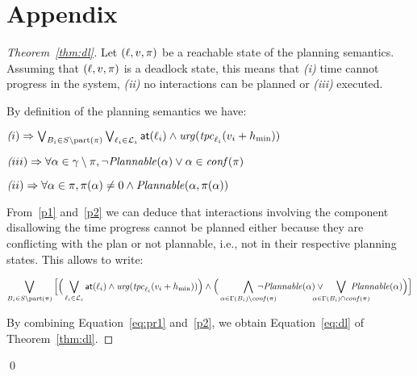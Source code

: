 \section{Appendix}
\begin{proof}[Theorem~\ref{thm:dl}]

Let $(\ell,v,\pi)$ be a reachable state of the planning semantics.
Assuming that $(\ell,v,\pi)$ is a deadlock state, this means that 
\emph{(i)} time cannot progress in the system, 
\emph{(ii)} no interactions can be planned or \emph{(iii)} executed.

By definition of the planning semantics we have:\\
\begin{description}[labelwidth=1.5cm]
  \setlength\itemsep{1em}
  \item[\namedlabel{p1}{R1}] $\emph(i)\Rightarrow
    \bigvee_{B_i\in S\setminus\mathrm{part}(\pi)}\bigvee_{\ell_i\in\mathcal{L}_i}\textnormal{\textsf{at}}(\ell_i)
    \wedge\textnormal{\textit{urg}}(\mathit{tpc}_{\ell_i}(v_i+h_{\min}))$
  \item[\namedlabel{p2}{R2}] $\emph(iii)\Rightarrow\forall\alpha\in\gamma\setminus\pi,
    \neg\mathit{Plannable(\alpha)}\vee\alpha\in\mathit{conf}(\pi)$
  \item[\namedlabel{p3}{R3}] $\emph(ii)\Rightarrow\forall\alpha\in\pi,\pi(\alpha)\neq0
        \wedge\mathit{Plannable(\alpha,\pi(\alpha))}$
\end{description}

From~\ref{p1} and~\ref{p2} we can deduce that interactions 
involving the component disallowing the time progress cannot be planned either because
they are conflicting with the plan or not plannable, i.e., not in their respective
planning states. This allows to write:
\begin{adjustwidth}{-8mm}{-8mm}
\begin{equation}\label{eq:pr1}
  \bigvee_{B_i\in S\setminus\p{\pi}}\Big[\Big(\bigvee_{\loc_i\in\Loc_i}\at{\loc_i}
    \wedge\urg(\tpc{\loc_i}(\val_i+h_{\min}))\Big)\wedge
    \Big(\bigwedge_{\alpha\in\Gamma(B_i)\setminus\confl(\pi)}\hspace{-8mm}
    \neg\plntxt{\alpha}\vee\hspace{-5mm}
    \bigvee_{\alpha\in\Gamma(B_i)\cap\confl(\pi)}\hspace{-8mm}\plntxt{\alpha}\Big)\Big]
\end{equation}
\end{adjustwidth}

By combining Equation~\ref{eq:pr1} and~\ref{p2}, we obtain Equation~\ref{eq:dl} of 
Theorem~\ref{thm:dl}.
\end{proof}
\qed


